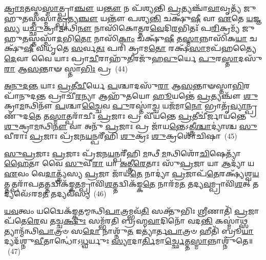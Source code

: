 \-\ul{𑌕𑍍𑌰𑌾}\-\-\ul{𑌮}\-\-\ul{𑌤}\-𑌸𑍍𑌤\-\ul{𑌸𑍍𑌮𑌾}\-𑌤𑍍𑌪𑍍𑌰𑌾\-\ul{𑌞𑍍𑌚𑍗} 𑌯\-\ul{𑌨𑍍𑌤𑍗} 𑌨 𑌪᳴𑌶𑍍𑌯𑌨𑍍𑌤𑌿 \ul{𑌪𑍍𑌰}\-𑌤𑍍𑌯𑌞𑍍𑌚𑌾᳴\-\ul{𑌵𑌾}\-𑌵𑍃𑌤𑍍𑌯᳴ 𑌜𑍁𑌹𑍁\-\ul{𑌤}\-𑌸𑍍𑌤𑌸𑍍𑌮𑌾॑\-\ul{𑌤𑍍𑌪𑍍𑌰}\-𑌤𑍍𑌯\-\ul{𑌞𑍍𑌚𑍗} 𑌯𑌨𑍍𑌤𑍗᳴ 𑌪𑌶𑍍𑌯\-\ul{𑌨𑍍𑌤𑌿} 𑌚𑌕𑍍𑌷𑍁᳴\-\ul{𑌷𑍀} 𑌵𑌾 \ul{𑌏}\-𑌤𑍇 \ul{𑌯}\-𑌜𑍍𑌞\-\ul{𑌸𑍍𑌯} 𑌯\-\ul{𑌚𑍍𑌛𑍁}\-𑌕𑍍𑌰𑌾\-\ul{𑌮}\-𑌨𑍍𑌥𑌿\-\ul{𑌨𑍗} 𑌨𑌾𑌸𑌿᳴𑌕𑍋𑌤𑍍𑌤𑌰\-\ul{𑌵𑍇}\-𑌦𑌿\-\ul{𑌰}\-𑌭𑌿𑌤𑌃᳴ 𑌪\-\ul{𑌰𑌿}\-𑌕𑍍𑌰𑌮𑍍𑌯᳴ 𑌜𑍁𑌹𑍁\-\ul{𑌤}\-𑌸𑍍𑌤𑌸𑍍𑌮𑌾᳴\-\ul{𑌦}\-𑌭𑌿\-\ul{𑌤𑍋} 𑌨𑌾𑌸𑌿᳴\-\ul{𑌕𑌾𑌂} 𑌚𑌕𑍍𑌷𑍁᳴\-\ul{𑌷𑍀} 𑌤\-\ul{𑌸𑍍𑌮𑌾}\-𑌨𑍍𑌨𑌾𑌸𑌿᳴𑌕\-\ul{𑌯𑌾} 𑌚𑌕𑍍𑌷𑍁᳴\-\ul{𑌷𑍀} 𑌵𑌿𑌧𑍃᳴𑌤𑍇 \ul{𑌸}\-𑌰𑍍𑌵\-\ul{𑌤𑌃} 𑌪𑌰𑌿᳴ 𑌕𑍍𑌰𑌾𑌮\-\ul{𑌤𑍋} 𑌰𑌕𑍍𑌷᳴\-\ul{𑌸𑌾}\-𑌮𑌪᳴𑌹𑌤𑍍𑌯𑍈 \ul{𑌦𑍇}\-𑌵𑌾 𑌵𑍈 𑌯𑌾𑌃 𑌪𑍍𑌰𑌾\-\ul{𑌚𑍀}\-𑌰𑌾𑌹𑍁᳴\-\ul{𑌤𑍀}\-𑌰𑌜𑍁᳴𑌹\-\ul{𑌵𑍁}\-𑌰𑍍𑌯𑍇 \ul{𑌪𑍁}\-𑌰\-\ul{𑌸𑍍𑌤𑌾}\-𑌦𑌸𑍁᳴\-\ul{𑌰𑌾} 𑌆\-\ul{𑌸}\-𑌨𑍍𑌤𑌾𑍟 𑌸𑍍𑌤𑌾\-\ul{𑌭𑌿𑌃} 𑌪𑍍𑌰~(44)

\-\ul{𑌅}\-\-\ul{𑌨𑍁}\-\-\ul{𑌦}\-\-\ul{𑌨𑍍𑌤} 𑌯𑌾𑌃 \ul{𑌪𑍍𑌰}\-𑌤𑍀\-\ul{𑌚𑍀}\-𑌰𑍍𑌯𑍇 \ul{𑌪}\-𑌶𑍍𑌚𑌾𑌦𑌸𑍁᳴\-\ul{𑌰𑌾} 𑌆\-\ul{𑌸}\-𑌨𑍍𑌤𑌾𑍟𑌸𑍍𑌤𑌾\-\ul{𑌭𑌿}\-𑌰𑌪𑌾᳴𑌨𑍁𑌦\-\ul{𑌨𑍍𑌤} 𑌪𑍍𑌰𑌾𑌚𑍀᳴\-\ul{𑌰}\-𑌨𑍍𑌯𑌾 𑌆𑌹𑍁᳴𑌤𑌯𑍋 \ul{𑌹𑍂}\-𑌯𑌨𑍍𑌤𑍇॑ \ul{𑌪𑍍𑌰}\-𑌤𑍍𑌯𑌞𑍍𑌚𑍗᳴ \ul{𑌶𑍁}\-𑌕𑍍𑌰𑌾\-\ul{𑌮}\-𑌨𑍍𑌥𑌿𑌨𑍗᳴ \ul{𑌪}\-𑌶𑍍𑌚𑌾\-\ul{𑌚𑍍𑌚𑍈}\-𑌵 \ul{𑌪𑍁}\-𑌰𑌸𑍍𑌤𑌾॑\-\ul{𑌚𑍍𑌚} 𑌯𑌜᳴𑌮𑌾\-\ul{𑌨𑍋} 𑌭𑍍𑌰𑌾𑌤𑍃᳴\-\ul{𑌵𑍍𑌯𑌾}\-𑌨𑍍𑌪𑍍𑌰 𑌣𑍁᳴𑌦\-\ul{𑌤𑍇} 𑌤\-\ul{𑌸𑍍𑌮𑌾}\-𑌤𑍍𑌪𑌰𑌾᳴𑌚𑍀𑌃 \ul{𑌪𑍍𑌰}\-𑌜𑌾𑌃 𑌪𑍍𑌰 𑌵𑍀᳴𑌯𑌨𑍍𑌤𑍇 \ul{𑌪𑍍𑌰}\-𑌤𑍀𑌚𑍀॑𑌰𑍍𑌜𑌾𑌯𑌨𑍍𑌤𑍇 \ul{𑌶𑍁}\-𑌕𑍍𑌰𑌾\-\ul{𑌮}\-𑌨𑍍𑌥𑌿\-\ul{𑌨𑍗} 𑌵𑌾 𑌅𑌨𑍁᳴ \ul{𑌪𑍍𑌰}\-𑌜𑌾𑌃 𑌪𑍍𑌰 𑌜𑌾᳴𑌯\-\ul{𑌨𑍍𑌤𑍇}\-\-𑌽𑌤𑍍𑌤𑍍𑌰𑍀\-\ul{𑌶𑍍𑌚𑌾}\-𑌦𑍍𑌯𑌾॑𑌶𑍍𑌚 \ul{𑌸𑍁}\-𑌵𑍀𑌰𑌾𑌃॑ \ul{𑌪𑍍𑌰}\-𑌜𑌾𑌃 𑌪𑍍𑌰᳴\-\ul{𑌜}\-𑌨\-\ul{𑌯}\-𑌨𑍍𑌪𑌰𑍀᳴𑌹𑌿 \ul{𑌶𑍁}\-𑌕𑍍𑌰𑌃 \ul{𑌶𑍁}\-𑌕𑍍𑌰𑌶𑍋᳴𑌚𑌿𑌷𑌾~(45)

\-\ul{𑌸𑍁}\-\-\ul{𑌪𑍍𑌰}\-𑌜𑌾𑌃 \ul{𑌪𑍍𑌰}\-𑌜𑌾𑌃 𑌪𑍍𑌰᳴\-\ul{𑌜}\-𑌨\-\ul{𑌯}\-𑌨𑍍𑌪𑌰𑍀᳴𑌹𑌿 \ul{𑌮}\-𑌨𑍍𑌥𑍀 \ul{𑌮}\-𑌨𑍍𑌥𑌿𑌶𑍋᳴\-\ul{𑌚𑌿}\-𑌷𑍇𑌤𑍍𑌯𑌾᳴\-\ul{𑌹𑍈}\-𑌤𑌾 𑌵𑍈 \ul{𑌸𑍁}\-𑌵𑍀\-\ul{𑌰𑌾} 𑌯𑌾 \ul{𑌅}\-𑌤𑍍𑌤𑍍𑌰𑍀\-\ul{𑌰𑍇}\-𑌤𑌾𑌃 𑌸𑍁᳴\-\ul{𑌪𑍍𑌰}\-𑌜𑌾 𑌯𑌾 \ul{𑌆}\-𑌦𑍍𑌯𑌾᳴ 𑌯 \ul{𑌏}\-𑌵𑌂 𑌵𑍇\-\ul{𑌦𑌾}\-𑌤𑍍𑌤𑍍𑌰𑍍𑌯᳴𑌸𑍍𑌯 \ul{𑌪𑍍𑌰}\-𑌜𑌾 𑌜𑌾᳴𑌯\-\ul{𑌤𑍇} 𑌨𑌾𑌦𑍍𑌯𑌾॑ \ul{𑌪𑍍𑌰}\-𑌜𑌾𑌪᳴\-\ul{𑌤𑍇}\-𑌰𑌕𑍍𑌷𑍍𑌯᳴𑌶𑍍𑌵\-\ul{𑌯}\-𑌤𑍍𑌤𑌤𑍍𑌪𑌰𑌾᳴𑌪\-\ul{𑌤}\-𑌤𑍍𑌤𑌦𑍍𑌵𑌿𑌕᳴𑌙𑍍𑌕\-\ul{𑌤}\-𑌮𑍍𑌪𑍍𑌰𑌾𑌵𑌿᳴\-\ul{𑌶}\-𑌤𑍍𑌤𑌦𑍍𑌵𑌿𑌕᳴𑌙𑍍𑌕\-\ul{𑌤𑍇} 𑌨𑌾𑌰᳴𑌮\-\ul{𑌤} 𑌤𑌦𑍍𑌯\-\ul{𑌵}\-𑌮𑍍𑌪𑍍𑌰𑌾𑌵𑌿᳴\-\ul{𑌶}\-𑌤𑍍 𑌤𑌦𑍍𑌯𑌵𑍇᳴\-𑌽𑌰𑌮\-\ul{𑌤} 𑌤𑌦𑍍𑌯𑌵᳴𑌸𑍍𑌯~(46)

\-\ul{𑌯}\-\-\ul{𑌵}\-𑌤𑍍𑌵𑌂 𑌯𑌦𑍍𑌵𑍈𑌕᳴𑌙𑍍𑌕𑌤𑌮𑍍𑌮𑌨𑍍𑌥𑌿\-\ul{𑌪𑌾}\-𑌤𑍍𑌰𑌮𑍍𑌭𑌵᳴\-\ul{𑌤𑌿} 𑌸𑌕𑍍𑌤𑍁᳴𑌭𑌿𑌃 \ul{𑌶𑍍𑌰𑍀}\-𑌣𑌾𑌤𑌿᳴ \ul{𑌪𑍍𑌰}\-𑌜𑌾𑌪᳴𑌤𑍇\-\ul{𑌰𑍇}\-𑌵 𑌤𑌚𑍍𑌚\-\ul{𑌕𑍍𑌷𑍁𑌃} 𑌸𑌮𑍍𑌭᳴𑌰𑌤𑌿 𑌬𑍍𑌰𑌹𑍍𑌮\-\ul{𑌵𑌾}\-𑌦𑌿𑌨𑍋᳴ 𑌵𑌦\-\ul{𑌨𑍍𑌤𑌿} 𑌕𑌸𑍍𑌮𑌾॑\-\ul{𑌥𑍍𑌸}\-𑌤𑍍𑌯𑌾𑌨𑍍𑌮᳴𑌨𑍍𑌥𑌿\-\ul{𑌪𑌾}\-𑌤𑍍𑌰𑍞 𑌸\-\ul{𑌦𑍋} 𑌨𑌾𑌶𑍍𑌨𑍁᳴\-\ul{𑌤} 𑌇𑌤𑍍𑌯𑌾॑𑌰𑍍𑌤\-\ul{𑌪𑌾}\-𑌤𑍍𑌰𑍞 𑌹𑍀𑌤𑌿᳴ 𑌬𑍍𑌰𑍂\-\ul{𑌯𑌾}\-𑌦𑍍𑌯𑌦᳴𑌶𑍍𑌨𑍁\-\ul{𑌵𑍀}\-𑌤𑌾𑌨𑍍𑌧𑍋॑\-𑌽\-\ul{𑌧𑍍𑌵}\-𑌰𑍍𑌯𑍁𑌃 \ul{𑌸𑍍𑌯𑌾}\-𑌦𑌾\-\ul{𑌰𑍍𑌤𑌿}\-𑌮𑌾\-\ul{𑌰𑍍𑌚𑍍𑌛𑍇}\-𑌤𑍍𑌤\-\ul{𑌸𑍍𑌮𑌾}\-𑌨𑍍𑌨𑌾𑌶𑍍𑌨𑍁᳴𑌤𑍇॥~(47)

{\anuvakamend[{\-\ul{𑌆}\-𑌤𑍍𑌮\-\ul{𑌨𑌾} 𑌪\-\ul{𑌰𑌾} 𑌨𑌿𑌷𑍍𑌪𑍍𑌰 \ul{𑌶𑍁}\-𑌕𑍍𑌰𑌶𑍋᳴𑌚𑌿\-\ul{𑌷𑌾} 𑌯𑌵᳴𑌸𑍍𑌯 \ul{𑌸}\-𑌪𑍍𑌤𑌤𑍍𑌰𑌿𑍞᳴𑌶𑌚𑍍𑌚}]}%

